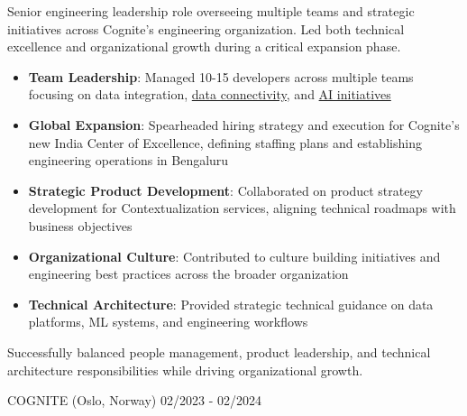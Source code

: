 \documentclass[singlesided,
               paper=a4,
               fontsize=10pt
              ]{my-resume}
\begin{document}
    {
        Senior engineering leadership role overseeing multiple teams and strategic initiatives across Cognite's engineering organization. Led both technical excellence and organizational growth during a critical expansion phase.

        \begin{itemize}[leftmargin=2em]
            \item \textbf{Team Leadership}: Managed 10-15 developers across multiple teams focusing on data integration, \href{https://www.cognite.com/en/contextualization}{data connectivity}, and \href{https://www.cognite.com/en/product/atlas}{AI initiatives}
            \item \textbf{Global Expansion}: Spearheaded hiring strategy and execution for Cognite's new India Center of Excellence, defining staffing plans and establishing engineering operations in Bengaluru
            \item \textbf{Strategic Product Development}: Collaborated on product strategy development for Contextualization services, aligning technical roadmaps with business objectives
            \item \textbf{Organizational Culture}: Contributed to culture building initiatives and engineering best practices across the broader organization
            \item \textbf{Technical Architecture}: Provided strategic technical guidance on data platforms, ML systems, and engineering workflows
        \end{itemize}

        Successfully balanced people management, product leadership, and technical architecture responsibilities while driving organizational growth.
    }
%
	{COGNITE (Oslo, Norway)}
	{02/2023 - 02/2024}
\end{document}
